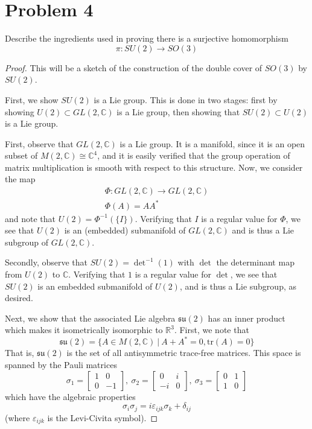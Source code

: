\documentclass[fontsize=11pt]{scrartcl} %
\numberwithin{equation}{section} %
\numberwithin{figure}{section} %
\numberwithin{table}{section} %
\newcommand{\R}{\mathbb{R}}
\newcommand{\C}{\mathbb{C}}
\newcommand{\tr}{\text{tr}}
\begin{document}
\newpage

\section*{Problem 4}
Describe the ingredients used in proving there is a surjective homomorphism
\[
    \pi:SU(2)\to SO(3)
\]

\begin{proof}
    This will be a sketch of the construction of the double cover of $SO(3)$ by
    $SU(2)$.

    First, we show $SU(2)$ is a Lie group. This is done in two stages: first by
    showing $U(2)\subset GL(2,\C)$ is a Lie group, then showing that
    $SU(2)\subset U(2)$ is a Lie group.

    First, observe that $GL(2,\C)$ is a Lie group. It is a manifold, since it is
    an open subset of $M(2,\C)\cong \C^4$, and it is easily verified that the
    group operation of matrix multiplication is smooth with respect to this
    structure. Now, we consider the map
    \[
\begin{aligned}
    \Phi:GL(2,\C)\to GL(2,\C)\\
    \Phi(A) = AA^*
\end{aligned}
    \]
    and note that $U(2) = \Phi^{-1}(\{I\})$. Verifying that $I$ is a regular
    value for $\Phi$, we see that $U(2)$ is an (embedded) submanifold of
    $GL(2,\C)$ and is thus a Lie subgroup of $GL(2,\C)$.

    Secondly, observe that $SU(2) = {\det}^{-1}(1)$ with $\det$ the determinant
    map from $U(2)$ to $\C$. Verifying that $1$ is a regular value for $\det$,
    we see that $SU(2)$ is an embedded submanifold of $U(2)$, and is thus a Lie
    subgroup, as desired.

    Next, we show that the associated Lie algebra $\mathfrak{su}(2)$ has an
    inner product which makes it isometrically isomorphic to $\R^3$. First, we
    note that 
    \[
        \mathfrak{su}(2) = \{A\in M(2,\C)\ |\ A + A^* = 0, \tr(A)=0\}
    \]
    That is, $\mathfrak{su}(2)$ is the set of all antisymmetric trace-free
    matrices. This space is spanned by the Pauli matrices
    \[
        \sigma_1 = 
        \begin{bmatrix}
            1&0\\
            0&-1
        \end{bmatrix}
        ,\ 
        \sigma_2 =
        \begin{bmatrix}
            0&i\\
            -i&0
        \end{bmatrix}
        ,\ 
        \sigma_3 =
        \begin{bmatrix}
            0&1\\
            1&0
        \end{bmatrix}
    \]
    which have the algebraic properties
    \[
        \sigma_i\sigma_j = i\varepsilon_{ijk}\sigma_k + \delta_{ij}
    \]
    (where $\varepsilon_{ijk}$ is the Levi-Civita symbol).


\end{proof}
\end{document}
